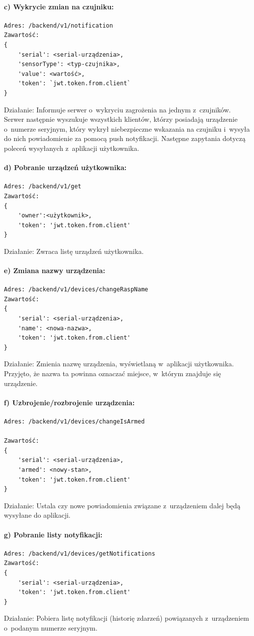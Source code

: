 \paragraph{c) Wykrycie zmian na czujniku:}
\begin{verbatim}
Adres: /backend/v1/notification
Zawartość: 
{
	'serial': <serial-urządzenia>, 
	'sensorType': <typ-czujnika>, 
	'value': <wartość>, 
	'token': `jwt.token.from.client`
}
\end{verbatim}
Działanie: Informuje serwer o~wykryciu zagrożenia na jednym z~czujników. Serwer następnie wyszukuje wszystkich klientów, którzy posiadają urządzenie o~numerze seryjnym, który wykrył niebezpieczne wskazania na czujniku i~wysyła do nich powiadomienie za pomocą push notyfikacji. \newline
Następne zapytania dotyczą poleceń wysyłanych z~aplikacji użytkownika.
\paragraph{d) Pobranie urządzeń użytkownika:}
\begin{verbatim}
Adres: /backend/v1/get
Zawartość: 
{
	'owner':<użytkownik>, 
	'token': 'jwt.token.from.client'
}
\end{verbatim}
Działanie: Zwraca listę urządzeń użytkownika.
\paragraph{e) Zmiana nazwy urządzenia:}
\begin{verbatim}
Adres: /backend/v1/devices/changeRaspName
Zawartość:
{
	'serial': <serial-urządzenia>, 
	'name': <nowa-nazwa>, 
	'token': 'jwt.token.from.client'
}
\end{verbatim}
Działanie: Zmienia nazwę urządzenia, wyświetlaną w~aplikacji użytkownika. Przyjęto, że nazwa ta powinna oznaczać miejsce, w~którym znajduje się urządzenie.
\paragraph{f) Uzbrojenie/rozbrojenie urządzenia:}
\begin{verbatim}
Adres: /backend/v1/devices/changeIsArmed

Zawartość: 
{
	'serial': <serial-urządzenia>, 
	'armed': <nowy-stan>, 
	'token': 'jwt.token.from.client'
}
\end{verbatim}
Działanie: Ustala czy nowe powiadomienia związane z~urządzeniem dalej będą wysyłane do aplikacji.
\paragraph{g) Pobranie listy notyfikacji:}
\begin{verbatim}
Adres: /backend/v1/devices/getNotifications
Zawartość: 
{
	'serial': <serial-urządzenia>,  
	'token': 'jwt.token.from.client'
}
\end{verbatim}
Działanie: Pobiera listę notyfikacji (historię zdarzeń) powiązanych z~urządzeniem o~podanym numerze seryjnym.
